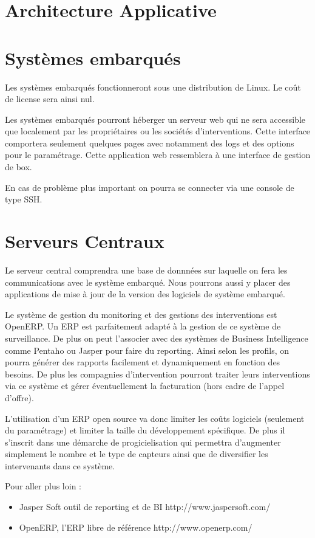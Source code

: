 \section{Architecture Applicative}

\section{Systèmes embarqués}

Les systèmes embarqués fonctionneront sous une distribution de Linux. Le
coût de license sera ainsi nul. 

Les systèmes embarqués pourront héberger un serveur web qui ne sera
accessible que localement par les propriétaires ou les sociétés
d'interventions. Cette interface comportera seulement quelques pages avec
notamment des logs et des options pour le paramétrage. Cette application
web ressemblera à une interface de gestion de box.

En cas de problème plus important on pourra se connecter via une console de
type SSH.

\section{Serveurs Centraux}

Le serveur central comprendra une base de donnnées sur laquelle on fera les
communications avec le système embarqué. Nous pourrons aussi y placer des
applications de mise à jour de la version des logiciels de système
embarqué. 

Le système de gestion du monitoring et des gestions des interventions est
OpenERP. Un ERP est parfaitement adapté à la gestion de ce système de
surveillance. De plus on peut l'associer avec des systèmes de Business
Intelligence comme Pentaho ou Jasper pour faire du reporting. Ainsi selon
les profils, on pourra générer des rapports facilement et dynamiquement en
fonction des besoins.  De plus les compagnies d'intervention pourront
traiter leurs interventions via ce système et gérer éventuellement la
facturation (hors cadre de l'appel d'offre).

L'utilisation d'un ERP open source va donc limiter les coûts logiciels
(seulement du paramétrage) et limiter la taille du développement
spécifique. De plus il s'inscrit dans une démarche de progicielisation qui
permettra d'augmenter simplement le nombre et le type de capteurs ainsi que
de diversifier les intervenants dans ce système.

Pour aller plus loin : 
\begin{itemize}
\item Jasper Soft outil de reporting et de BI http://www.jaspersoft.com/
\item OpenERP, l'ERP libre de référence http://www.openerp.com/
\end{itemize}

